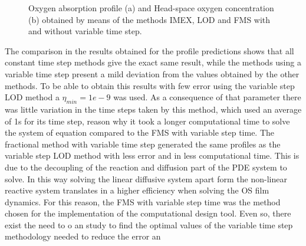 \begin{figure}[ht]
    \centering
    \caption{Oxygen absorption profile (a) and  Head-space oxygen concentration (b) obtained by means of the methods IMEX, LOD and FMS with and without variable time step.}
    \label{fig:Comparacion_resultados_metodos}
\end{figure}

The comparison in the results obtained for the profile predictions shows that all constant time step methods give the exact same result, while the methods using a variable time step present a mild deviation from the values obtained by the other methods. To be able to obtain this results with few error using the variable step LOD method a $\eta_{min}=1e-9$ was used. As a consequence of that parameter there was little variation in the time steps taken by this method, which used an average of 1s for its time step, reason why it took a longer computational time to solve the system of equation compared to the FMS with variable step time. The fractional method with variable time step generated the same profiles as the variable step LOD method with less error and in less computational time. This is due to the  decoupling of the reaction and diffusion part of the PDE system to solve. In this way solving the linear diffusive system apart form the non-linear reactive system translates in a higher efficiency when solving the OS film dynamics. For this reason, the FMS with variable step time was the method chosen for the implementation of the computational design tool. Even so, there exist the need to o an study to find the optimal values of the variable time step methodology needed to reduce the error an


